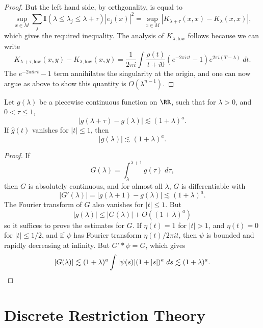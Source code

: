 \begin{proof}
    But the left hand side, by orthgonality, is equal to
    \[ \sup_{x \in M} \sum_j \mathbf{I}(\lambda \leq \lambda_j \leq \lambda + \tau) |e_j(x)|^2 = \sup_{x \in M} |K_{\lambda + \tau}(x,x) - K_{\lambda}(x,x)|, \]
    which gives the required inequality. The analysis of $K_{\lambda, \text{low}}$ follows because we can write
    \[ K_{\lambda + \tau, \text{low}}(x,y) - K_{\lambda, \text{low}}(x,y) = \frac{1}{2 \pi i} \int \frac{\rho(t)}{t + i0} (e^{-2 \pi i \tau t} - 1) e^{2 \pi i (T - \lambda)}\; dt. \]
    The $e^{-2 \pi i t \tau t} - 1$ term annihilates the singularity at the origin, and one can now argue as above to show this quantity is $O(\lambda^{n-1})$.
\end{proof}

\begin{lemma}
    Let $g(\lambda)$ be a piecewise continuous function on $\RR$, such that for $\lambda > 0$, and $0 < \tau \leq 1$,
    \[ |g(\lambda + \tau) - g(\lambda)| \lesssim (1 + \lambda)^a. \]
    If $\widehat{g}(t)$ vanishes for $|t| \leq 1$, then
    \[ |g(\lambda)| \lesssim (1 + \lambda)^a. \]
\end{lemma}
\begin{proof}
    If
    \[ G(\lambda) = \int_\lambda^{\lambda + 1} g(\tau)\; d\tau, \]
    then $G$ is absolutely continuous, and for almost all $\lambda$, $G$ is differentiable with
    \[ |G'(\lambda)| = |g(\lambda + 1) - g(\lambda)| \lesssim (1 + \lambda)^a. \]
    The Fourier transform of $G$ also vanishes for $|t| \leq 1$. But
    \[ |g(\lambda)| \leq |G(\lambda)| + O((1 + \lambda)^a) \]
    so it suffices to prove the estimates for $G$. If $\eta(t) = 1$ for $|t| > 1$, and $\eta(t) = 0$ for $|t| \leq 1/2$, and if $\psi$ has Fourier transform $\eta(t) / 2 \pi i t$, then $\psi$ is bounded and rapidly decreasing at infinity. But $G' * \psi = G$, which gives
    \[ |G(\lambda)| \lesssim (1 + \lambda)^a \int |\psi(s)| (1 + |s|)^a\; ds \lesssim (1 + \lambda)^a. \qedhere \]
\end{proof}









\section{Discrete Restriction Theory}

